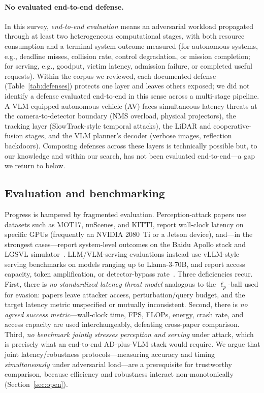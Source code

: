 \documentclass[acmsmall,screen,review,nonacm]{acmart}
\begin{document}
\paragraph{No evaluated end-to-end defense.} In this survey, \emph{end-to-end evaluation} means an adversarial workload propagated through at least two heterogeneous computational stages, with both resource consumption and a terminal system outcome measured (for autonomous systems, e.g., deadline misses, collision rate, control degradation, or mission completion; for serving, e.g., goodput, victim latency, admission failure, or completed useful requests). Within the corpus we reviewed, each documented defense (Table~\ref{tab:defenses}) protects one layer and leaves others exposed; we did not identify a defense evaluated end-to-end in this sense across a multi-stage pipeline. A VLM-equipped autonomous vehicle (AV) faces simultaneous latency threats at the camera-to-detector boundary (NMS overload, physical projectors), the tracking layer (SlowTrack-style temporal attacks), the LiDAR and cooperative-fusion stages, and the VLM planner's decoder (verbose images, reflection backdoors). Composing defenses across these layers is technically possible but, to our knowledge and within our search, has not been evaluated end-to-end---a gap we return to below.



\subsection{Evaluation and benchmarking}
\label{sec:eval}

Progress is hampered by fragmented evaluation. Perception-attack papers use datasets such as MOT17, nuScenes, and KITTI, report wall-clock latency on specific GPUs (frequently an NVIDIA 2080~Ti or a Jetson device), and---in the strongest cases---report system-level outcomes on the Baidu Apollo stack and LGSVL simulator~\cite{ma2024slowtrack}. LLM/VLM-serving evaluations instead use vLLM-style serving benchmarks on models ranging up to Llama-3-70B, and report access capacity, token amplification, or detector-bypass rate~\cite{zhang2025pd3f,liu2026reasoningbomb}. Three deficiencies recur. First, there is \emph{no standardized latency threat model} analogous to the $\ell_p$-ball used for evasion: papers leave attacker access, perturbation/query budget, and the target latency metric unspecified or mutually inconsistent. Second, there is \emph{no agreed success metric}---wall-clock time, FPS, FLOPs, energy, crash rate, and access capacity are used interchangeably, defeating cross-paper comparison. Third, \emph{no benchmark jointly stresses perception and serving} under attack, which is precisely what an end-to-end AD-plus-VLM stack would require. We argue that joint latency/robustness protocols---measuring accuracy and timing \emph{simultaneously} under adversarial load---are a prerequisite for trustworthy comparison, because efficiency and robustness interact non-monotonically (Section~\ref{sec:open}).
\end{document}
